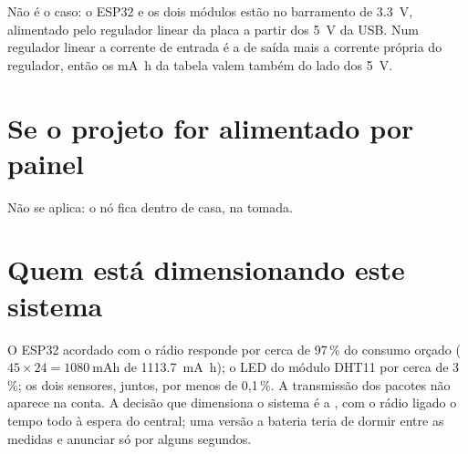 Não é o caso: o ESP32 e os dois módulos estão no barramento de
\SI{3.3}{\volt}, alimentado pelo regulador linear da placa a partir dos
\SI{5}{\volt} da USB. Num regulador linear a corrente de entrada é a de
saída mais a corrente própria do regulador, então os
\si{\milli\ampere\hour} da tabela valem também do lado dos
\SI{5}{\volt}.

\section*{Se o projeto for alimentado por painel}
{}

Não se aplica: o nó fica dentro de casa, na tomada.

\section*{Quem está dimensionando este sistema}
{}

O ESP32 acordado com o rádio responde por cerca de 97\,\% do consumo
orçado ($45 \times 24 = \SI{1080}{\milli\ampere\hour}$ de
\SI{1113.7}{\milli\ampere\hour}); o LED do módulo DHT11 por cerca de 3\,\%;
os dois sensores, juntos, por menos de 0,1\,\%. A transmissão dos pacotes
não aparece na conta. A decisão que dimensiona o sistema é a , com
o rádio ligado o tempo todo à espera do central; uma versão a bateria
teria de dormir entre as medidas e anunciar só por alguns segundos.
